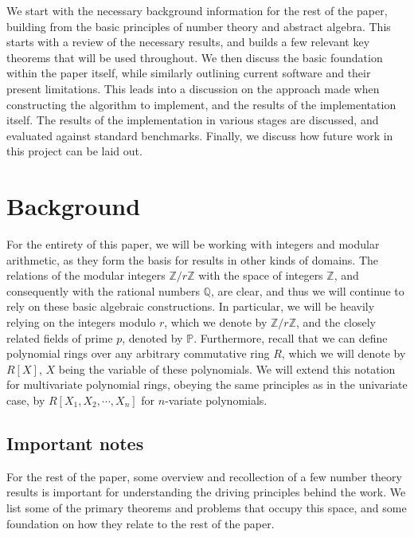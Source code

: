\documentclass[pageno]{jpaper}
\begin{document}
We start with the necessary background information for the rest of the paper, building from the basic principles of number theory and abstract algebra.
This starts with a review of the necessary results, and builds a few relevant key theorems that will be used throughout.
We then discuss the basic foundation within the paper itself, while similarly outlining current software and their present limitations.
This leads into a discussion on the approach made when constructing the algorithm to implement, and the results of the implementation itself.
The results of the implementation in various stages are discussed, and evaluated against standard benchmarks.
Finally, we discuss how future work in this project can be laid out.

\section{Background}
For the entirety of this paper, we will be working with integers and modular arithmetic, as they form the basis for results in other kinds of domains.
The relations of the modular integers $\mathbb{Z}/r\mathbb{Z}$ with the space of integers $\mathbb{Z}$, and consequently with the rational numbers $\mathbb{Q}$, are clear, and thus we will continue to rely on these basic algebraic constructions.
In particular, we will be heavily relying on the integers modulo $r$, which we denote by $\mathbb{Z}/r\mathbb{Z}$, and the closely related fields of prime $p$, denoted by $\mathbb{P}$.
Furthermore, recall that we can define polynomial rings over any arbitrary commutative ring $R$, which we will denote by $R[X]$, $X$ being the variable of these polynomials.
We will extend this notation for multivariate polynomial rings, obeying the same principles as in the univariate case, by $R[X_1, X_2, \cdots, X_n]$ for $n$-variate polynomials.

\subsection{Important notes}
For the rest of the paper, some overview and recollection of a few number theory results is important for understanding the driving principles behind the work.
We list some of the primary theorems and problems that occupy this space, and some foundation on how they relate to the rest of the paper.
\end{document}
